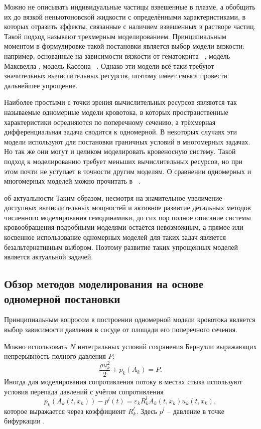 Можно не описывать индивидуальные частицы взвешенные в плазме, а обобщить их до вязкой неньютоновской жидкости с определёнными 
характеристиками, в которых отразить эффекты, связанные с наличием взвешенных в растворе частиц. Такой подход называют трехмерным моделированием.
Принципиальным моментом в формулировке такой постановки является выбор модели вязкости: например,
основанные на зависимости вязкости от гематокрита ~\cite{walburn:1976},
модель Максвелла \cite{thurston:1972},  модель Кассона ~\cite{moller:2006}.
Однако эти модели всё-таки требуют значительных вычислительных ресурсов, поэтому имеет смысл провести дальнейшее упрощение.

Наиболее простыми с точки зрения вычислительных ресурсов являются так называемые одномерные модели кровотока, в которых
пространственные характеристики осредняются по поперечному сечению, а трёхмерная дифференциальная
задача сводится к одномерной.
В некоторых случаях эти модели используют для постановки граничных условий в многомерных задачах.
Но так же они могут и целиком моделировать кровеносную систему.
Такой подход к моделированию требует меньших вычислительных ресурсов, но при этом почти не уступает в 
точности другим моделям. О сравнении одномерных и многомерных моделей можно прочитать в ~\cite{FORMAGGIA:2001}.

{ об актуальности}
Таким образом, несмотря на значительное увеличение доступных вычислительных мощностей и активное развитие детальных методов
численного моделирования гемодинамики, до сих пор полное описание системы кровообращения подробными моделями остаётся невозможным, 
а прямое или косвенное использование одномерных моделей для таких задач является безальтернативным выбором.
Поэтому развитие таких упрощённых моделей является актуальной задачей.

\subsection{Обзор методов моделирования на основе одномерной постановки}

Принципиальным вопросом в построении одномерной модели кровотока является выбор зависимости давления в сосуде от площади его
поперечного сечения.

Можно использовать $N$ интегральных условий сохранения Бернулли выражающих непрерывность полного давления $P$:
\begin{equation*}
    \label{eq:bernulli}
    \frac{\rho u^2_k}{2}+{p_k(A_k)}=P.
\end{equation*}
Иногда для моделирования сопротивления потоку в местах стыка используют условия перепада давлений
с учётом сопротивления
\begin{equation*}
    \label{eq:p-pressure}
    p_k\left(A_k\left(t,x_k\right)\right)-p^l(t)=\varepsilon_k R^l_k A_k(t,x_k)u_k(t,x_k),
\end{equation*}
которое выражается через коэффициент $R^l_k$. Здесь $p^l$ -- давление в точке бифуркации \cite{bessonov:2014}.

